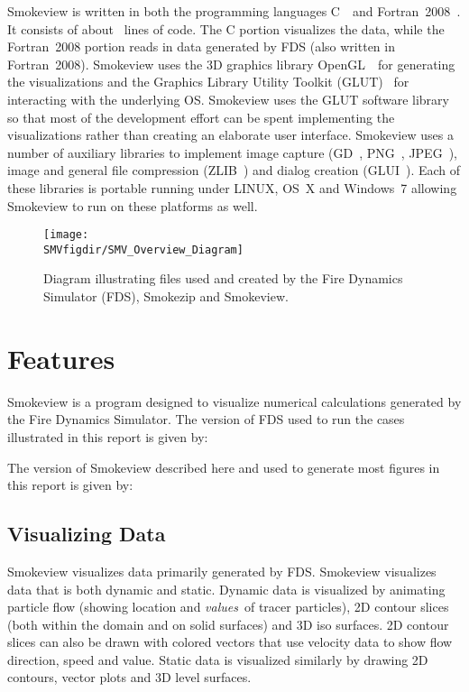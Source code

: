 \documentclass[11pt,twoside]{book}
\begin{document}
Smokeview is written in both the programming languages
C~\cite{C:book}\ and Fortran~2008~\cite{Fortran:book}.  It consists
of about \smvlines\ lines of code. The C portion visualizes the
data, while the Fortran~2008 portion reads in data generated by
FDS (also written in Fortran~2008). Smokeview uses the 3D graphics
library OpenGL~\cite{OpenGLRed}\ for generating the visualizations
and the Graphics Library Utility Toolkit (GLUT)~\cite{OpenGLGlut}
for interacting with the underlying OS. Smokeview uses the GLUT
software library so that most of the development effort can be
spent implementing the visualizations rather than creating an
elaborate user interface. Smokeview uses a number of auxiliary
libraries to implement image capture (GD~\cite{BOUTELL,GDLIB},
PNG~\cite{PNGLIB}, JPEG~\cite{JPEGLIB}), image and general file
compression (ZLIB~\cite{ZLIB}) and dialog creation
(GLUI~\cite{GLUILIB}). Each of these libraries is portable running
under LINUX, OS~X and Windows~7 allowing
Smokeview to run on these platforms as well.
\begin{figure}[bph]
\centerline{
\texttt{[image: \\SMVfigdir/SMV\_Overview\_Diagram]}}
 \caption[FDS file overview]{Diagram illustrating files used and created by the Fire Dynamics
 Simulator (FDS), Smokezip and Smokeview.}
\label{figfdsoverview}%
\end{figure}

\section{Features}

Smokeview is a program designed to visualize numerical
calculations generated by the Fire Dynamics Simulator.
The version of FDS used to run the cases illustrated  in this report
is given by:

The version of Smokeview described here and used
to generate most figures in this report is given by:


\subsection{Visualizing Data}

Smokeview visualizes data primarily generated by FDS.
Smokeview visualizes data that is both dynamic and static.  Dynamic
data is visualized by animating particle flow (showing
location and {\em values}\ of tracer particles), 2D contour
slices (both within the domain and on solid surfaces) and
3D iso surfaces.  2D contour slices can also be drawn
with colored vectors that use velocity data to show flow
direction, speed and value. Static data is visualized
similarly by drawing 2D contours, vector plots and 3D level
surfaces.
\end{document}
